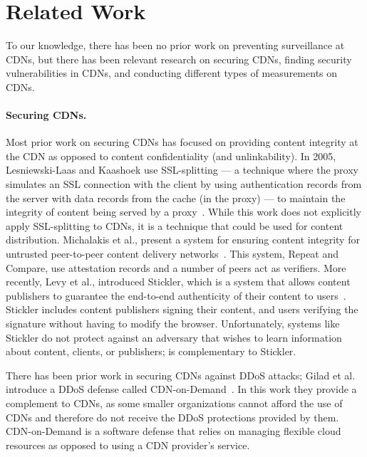 \section{Related Work}
\label{sec:related}

To our knowledge, there has been no prior work on preventing surveillance at CDNs, but there 
has been relevant research on securing CDNs, finding security vulnerabilities in CDNs, and 
conducting different types of measurements on CDNs.

\paragraph{Securing CDNs.} Most prior work on securing CDNs has focused on providing content 
integrity at the CDN as opposed to content confidentiality (and unlinkability).  In 2005, 
Lesniewski-Laas and Kaashoek use SSL-splitting --- a technique 
where the proxy simulates an SSL connection with the client by using authentication records from 
the server with data records from the cache (in the proxy) --- to maintain the 
integrity of content being served by a proxy~\cite{lesniewski2005ssl}.  While this work does not 
explicitly apply SSL-splitting to CDNs, it is a technique that could be used for content 
distribution.  Michalakis et al., present a system for ensuring content integrity for untrusted 
peer-to-peer content delivery networks~\cite{michalakis2007ensuring}.  This system, Repeat and 
Compare, use attestation records and a number of peers act as verifiers.  More recently, Levy et al., 
introduced Stickler, which is a system that allows content publishers to guarantee the end-to-end 
authenticity of their content to users~\cite{levy2015stickler}.  Stickler includes content publishers 
signing their content, and users verifying the signature without having to modify the browser.  Unfortunately, 
systems like Stickler do not protect against an adversary that wishes to learn information about content, clients, 
or publishers; \system{} is complementary to Stickler.

There has been prior work in securing CDNs against DDoS attacks; Gilad 
et al. introduce a DDoS defense called CDN-on-Demand~\cite{gilad2016cdn}.  In this work they 
provide a complement to CDNs, as some smaller organizations cannot afford the use of CDNs and 
therefore do not receive the DDoS protections provided by them.  CDN-on-Demand is a software 
defense that relies on managing flexible cloud resources as opposed to using a CDN provider's 
service.\\


